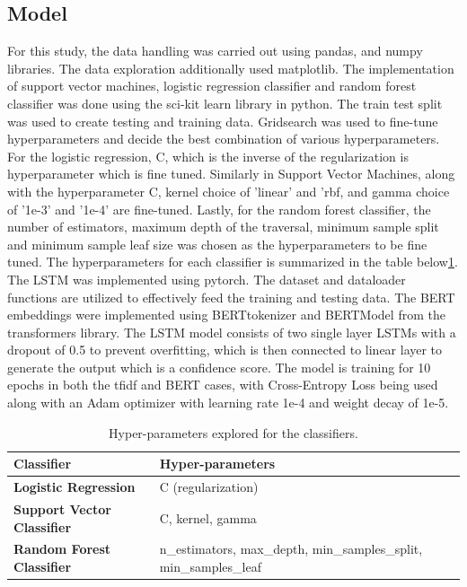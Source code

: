 \documentclass[12pt]{article}
\begin{document}
\subsection{Model}
For this study, the data handling was carried out using pandas, and numpy libraries. The data exploration additionally used matplotlib. The implementation of support vector machines, logistic regression classifier and random forest classifier was done using the sci-kit learn library in python. The train test split was used to create testing and training data. Gridsearch was used to fine-tune hyperparameters and decide the best combination of various hyperparameters. For the logistic regression, C, which is the inverse of the regularization is hyperparameter which is fine tuned. Similarly in Support Vector Machines, along with the hyperparameter C, kernel choice of 'linear' and 'rbf, and gamma choice of '1e-3' and '1e-4' are fine-tuned. Lastly, for the random forest classifier, the number of estimators, maximum depth of the traversal, minimum sample split and minimum sample leaf size was chosen as the hyperparameters to be fine tuned. The hyperparameters for each classifier is summarized in the table below\ref{table:hyp}. The LSTM was implemented using pytorch.  The dataset and dataloader functions are utilized to effectively feed the training and testing data. The BERT embeddings were implemented using BERTtokenizer and BERTModel from the transformers library. The LSTM model consists of two single layer LSTMs with a dropout of 0.5 to prevent overfitting, which is then connected to linear layer to generate the output which is a confidence score. The model is training for 10 epochs in both the tfidf and BERT cases, with Cross-Entropy Loss being used along with an Adam optimizer with learning rate 1e-4 and weight decay of 1e-5.

\begin{table}[ht]
\begin{tabular}{|l|l|}
\hline
\textbf{Classifier}                & \textbf{Hyper-parameters}                                          \\ \hline
\textbf{Logistic Regression}       & C (regularization)                                                 \\ \hline
\textbf{Support Vector Classifier} & C, kernel, gamma                                                   \\ \hline
\textbf{Random Forest Classifier}  & n\_estimators, max\_depth, min\_samples\_split, min\_samples\_leaf \\ \hline
\end{tabular}
\caption{Hyper-parameters explored for the classifiers.}
\label{table:hyp}
\end{table}
\end{document}
